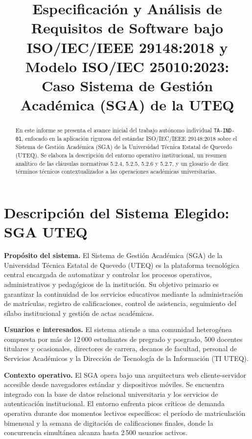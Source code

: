 \documentclass[conference]{IEEEtran}
\title{Especificación y Análisis de Requisitos de Software bajo ISO/IEC/IEEE 29148:2018 y Modelo ISO/IEC 25010:2023:\\Caso Sistema de Gestión Académica (SGA) de la UTEQ}
\author{
	\IEEEauthorblockN{José Ignacio Gilces Carranza}
	\IEEEauthorblockA{Universidad Técnica Estatal de Quevedo (UTEQ) --- Facultad de Ciencias de la Computación\\
		Ingeniería de Software $\cdot$ Ingeniería de Requerimientos (ISR-401) $\cdot$ Trabajo Autónomo Individual TA-IND-01}
}
\begin{document}
	\onecolumn
	\maketitle
	
	\begin{abstract}
		En este informe se presenta el avance inicial del trabajo autónomo individual \texttt{TA-IND-01}, enfocado en la aplicación rigurosa del estándar ISO/IEC/IEEE 29148:2018 sobre el Sistema de Gestión Académica (SGA) de la Universidad Técnica Estatal de Quevedo (UTEQ). Se elabora la descripción del entorno operativo institucional, un resumen analítico de las cláusulas normativas 5.2.4, 5.2.5, 5.2.6 y 5.2.7, y un glosario de diez términos técnicos contextualizados a las operaciones académicas universitarias.
	\end{abstract}
	
	\section{Descripción del Sistema Elegido: SGA UTEQ}
	\noindent\textbf{Propósito del sistema.} El Sistema de Gestión Académica (SGA) de la Universidad Técnica Estatal de Quevedo (UTEQ) es la plataforma tecnológica central encargada de automatizar y controlar los procesos operativos, administrativos y pedagógicos de la institución. Su objetivo primario es garantizar la continuidad de los servicios educativos mediante la administración de matrículas, registro de calificaciones, control de asistencia, seguimiento del sílabo institucional y gestión de actas académicas.
	
	\noindent\textbf{Usuarios e interesados.} El sistema atiende a una comunidad heterogénea compuesta por más de 12\,000 estudiantes de pregrado y posgrado, 500 docentes titulares y ocasionales, directores de carrera, decanos de facultad, personal de Servicios Académicos y la Dirección de Tecnología de la Información (TI UTEQ).
	
	\noindent\textbf{Contexto operativo.} El SGA opera bajo una arquitectura web cliente-servidor accesible desde navegadores estándar y dispositivos móviles. Se encuentra integrado con la base de datos relacional universitaria y los servicios de autenticación institucional. El entorno enfrenta picos críticos de demanda operativa durante dos momentos lectivos específicos: el período de matriculación bimensual y la semana de digitación de calificaciones finales, donde la concurrencia simultánea alcanza hasta 2\,500 usuarios activos.
	
\end{document}
